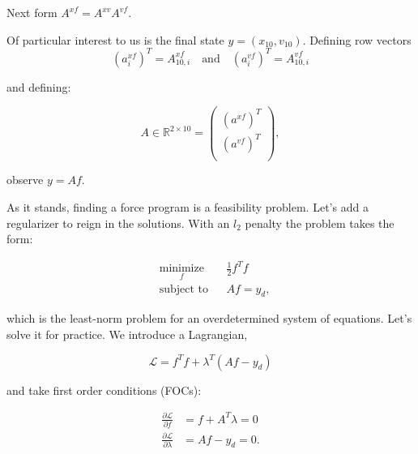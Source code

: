 \documentclass[12pt]{article}
\newcommand{\Lagr}{\mathcal{L}}
\begin{document}
\bigbreak

\noindent Next form $A^{xf} = A^{xv} A^{vf}$.

Of particular interest to us is the final state 
$y = (x_{10}, v_{10})$. Defining row vectors 
\begin{equation*}
    (a_i^{xf})^T = A^{xf}_{10, i} \quad\text{and}\quad 
    (a_i^{vf})^T = A^{vf}_{10, i}
\end{equation*}

and defining:

\begin{equation}
	A \in \mathbb{R} ^ {2 \times 10} = 
	\begin{pmatrix}
	    (a^{xf})^T \\[2pt]
	    (a^{vf})^T \\[2pt]
	\end{pmatrix},
\end{equation}

observe $y = A f$.

\bigbreak

As it stands, finding a force program is a feasibility problem. Let's add a regularizer to reign in the solutions. With an $l_2$ penalty the problem takes the form:

\bigbreak

\begin{equation}
\begin{aligned}
& \underset{f}{\text{minimize}}
& & \frac{1}{2} f^T f \\
& \text{subject to}
& & A f = y_d,
\end{aligned}
\end{equation}

\noindent which is the least-norm problem for an overdetermined system of equations. Let's solve it for practice. We introduce a Lagrangian, 

\begin{equation}
\Lagr = f^T f + \lambda ^ T (A f - y_d)
\end{equation}

\noindent and take first order conditions (FOCs):

\begin{subequations}
    \begin{align}
    \frac{\partial \Lagr}{\partial f} &= f + A^T \lambda = 0  \label{eq:foca} \\
    \frac{\partial \Lagr}{\partial \lambda} &= A f - y_d = 0. \label{eq:focb}
    \end{align}
\end{subequations}
\end{document}

